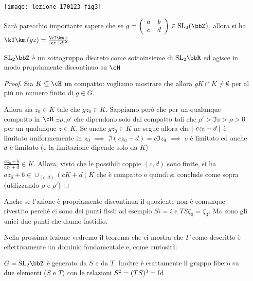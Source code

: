 \begin{center}
  \texttt{[image: lezione-170123-fig3]}
\end{center}

\begin{osservazione}
  Sarà parecchio importante sapere che se
  $g = \lbr{\begin{array}{cc} a & b \\ c & d \\ \end{array}} \in
  \SL_2(\bbZ)$, allora si ha $\Im (gz) = \frac{\Im z}{\abs{cz + d}^2}$.
\end{osservazione}

\begin{lemma}
  $\SL_2 \bbZ$ è un sottogruppo discreto come sottoinsieme di $\SL_2 \bbR$
  ed agisce in modo propriamente discontinuo su $\cH$
\end{lemma}
\begin{proof}
  Sia $K \subseteq \cH$ un compatto: vogliamo mostrare che allora
  $gK \cap K \neq \emptyset$ per al più un numero finito di $g \in G$.

  Allora sia $z_0 \in K$ tale che $g z_0 \in K$. Sappiamo però che per
  un qualunque compatto in $\cH$ $\exists \rho, \rho'$ che dipendono
  solo dal compatto tali che $\rho' > \Im z > \rho > 0$ per un qualunque
  $z \in K$. Se anche $g z_0 \in K$ ne segue allora che $\mid cz_0 + d \mid$
  è limitato uniformemente in $z_0$ $\implies$
  $\Im (cz_0 + d) = c \Im z_0$ $\implies$ $c$ è limitato ed anche $d$ è
  limitato (e la limitazione dipende solo da $K$)

  $\frac{a z_0 + b}{c z_0 + d} \in K$. Allora, visto che le possibili
  coppie $(c, d)$ sono finite, si ha
  $a z_0 + b \in \cup_{(c, d)} (cK + d)K$ che è compatto e quindi si
  conclude come sopra (utilizzando $\rho$ e $\rho'$)
\end{proof}

Anche se l'azione è propriamente discontinua il quoziente non è comunque
rivestito perché ci sono dei punti fissi: ad esempio $Si = i$ e $TS
\zeta_3 = \zeta_3$. Ma sono gli unici due punti che danno fastidio.


Nella prossima lezione vedremo il teorema che ci mostra che $F$ come
descritto è effettivamente un dominio fondamentale e, come curiosità:
\begin{teorema}
  $G = \SL_2 \bbZ$ è generato da $S$ e da $T$. Inoltre è esattamente il
  gruppo libero su due elementi ($S$ e $T$) con le relazioni
  $S^2 = (TS)^3 = \text{Id}$
\end{teorema}

